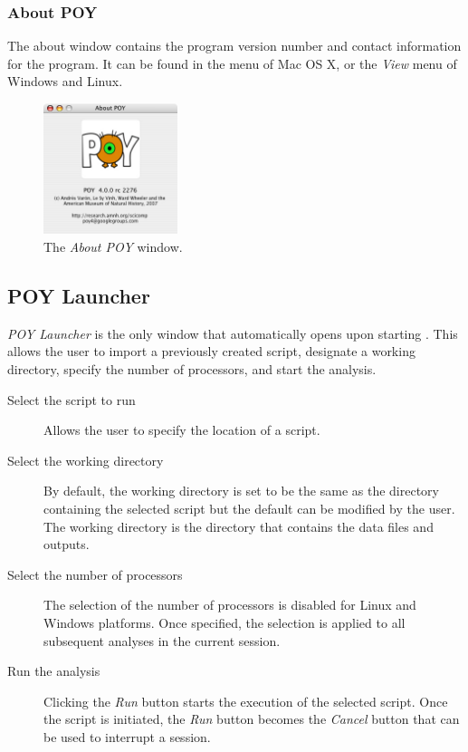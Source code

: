 \subsubsection{About POY}

The about window contains the program version number and contact information for
the program. It can be found in the \poy menu of Mac OS X, or the \emph{View} menu of
Windows and Linux.
\begin{figure}[htpb]
    \begin{center}
        \includegraphics[width=0.35\textwidth]{figures/about_window.jpg}
    \end{center}
    \caption{The \emph{About POY} window.}
    \label{fig:about_window}
\end{figure}

\subsection{POY Launcher} 
\emph{POY Launcher} is the only window that automatically opens upon starting
\poy. This allows the user to import a previously created script,
designate a working directory, specify the number of processors,
and start the analysis.

\begin{description}
	\item[Select the script to run]
     Allows the user to specify the location of a \poy script.
	\item[Select the working directory]
    By default, the working directory is set to be the same as the
    directory containing the selected \poy script but the default
    can be modified by the user. The working directory is the
    directory that contains the data files and outputs.
	\item[Select the number of processors]
    The selection of the number of processors is disabled for Linux
    and Windows platforms. Once specified, the selection is applied
    to all subsequent analyses in the current \poy session.
	\item[Run the analysis]
    Clicking the \emph{Run} button starts the execution of the selected
    script. Once the script is initiated, the \emph{Run} button
    becomes the \emph{Cancel} button that can be used to interrupt
    a \poy session.
\end{description}

